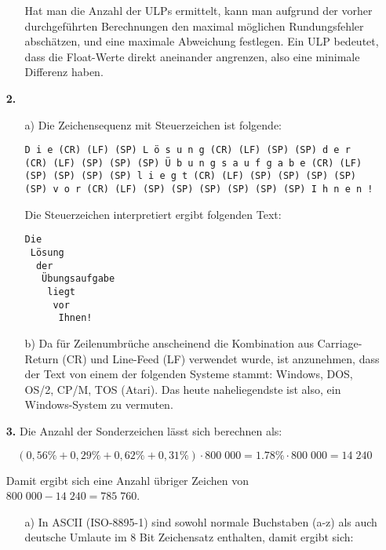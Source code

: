 \documentclass[a4paper,10pt]{scrartcl}
\begin{document}
\begin{enumerate}
\begin{enumerate}
                Hat man die Anzahl der ULPs ermittelt, kann man aufgrund der vorher durchgeführten Berechnungen
                den maximal möglichen Rundungsfehler abschätzen, und eine maximale Abweichung festlegen. Ein ULP
                bedeutet, dass die Float-Werte direkt aneinander angrenzen, also eine minimale Differenz haben.
        \end{enumerate}

    \item[\textbf{2.}]
        \begin{enumerate}
            \item[a)]
                Die Zeichensequenz mit Steuerzeichen ist folgende:

                \begin{verbatim}
D i e (CR) (LF) (SP) L ö s u n g (CR) (LF) (SP) (SP) d e r
(CR) (LF) (SP) (SP) (SP) Ü b u n g s a u f g a b e (CR) (LF)
(SP) (SP) (SP) (SP) l i e g t (CR) (LF) (SP) (SP) (SP) (SP)
(SP) v o r (CR) (LF) (SP) (SP) (SP) (SP) (SP) (SP) I h n e n !
                \end{verbatim}

                Die Steuerzeichen interpretiert ergibt folgenden Text:
                \begin{verbatim}
Die
 Lösung
  der
   Übungsaufgabe
    liegt
     vor
      Ihnen!
                \end{verbatim}

            \item[b)]
                Da für Zeilenumbrüche anscheinend die Kombination aus Carriage-Return (CR) und Line-Feed (LF)
                verwendet wurde, ist anzunehmen, dass der Text von einem der folgenden Systeme stammt:
                Windows, DOS, OS/2, CP/M, TOS (Atari). Das heute naheliegendste ist also, ein Windows-System zu vermuten.
        \end{enumerate}

    \item[\textbf{3.}]
        Die Anzahl der Sonderzeichen lässt sich berechnen als:

        $$(0,56\% + 0,29\% + 0,62\% + 0,31\%) \cdot 800\;000 = 1.78\% \cdot 800\;000 = 14\;240$$

        Damit ergibt sich eine Anzahl übriger Zeichen von $800\;000 - 14\;240 = 785\;760$.

        \begin{enumerate}
            \item[a)]
                In ASCII (ISO-8895-1) sind sowohl normale Buchstaben (a-z) als auch deutsche Umlaute im 8 Bit Zeichensatz
                enthalten, damit ergibt sich:


\end{enumerate}
\end{enumerate}
\end{document}
